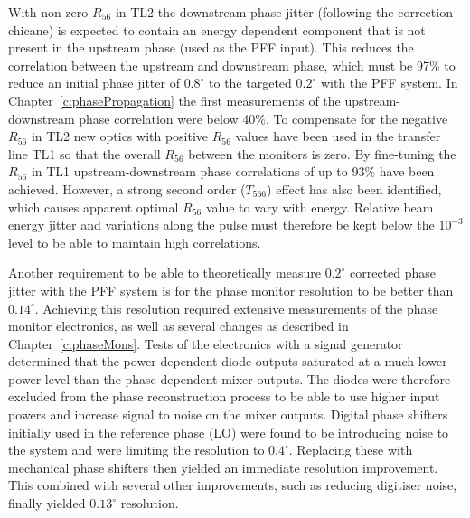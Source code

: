 With non-zero \(R_{56}\) in TL2 the downstream phase jitter (following the correction chicane) is expected to contain an energy dependent component that is not present in the upstream phase (used as the PFF input). This reduces the correlation between the upstream and downstream phase, which must be 97\% to reduce an initial phase jitter of \(0.8^\circ\) to the targeted \(0.2^\circ\) with the PFF system. In Chapter~\ref{c:phasePropagation} the first measurements of the upstream-downstream phase correlation were below 40\%. To compensate for the negative \(R_{56}\) in TL2 new optics with positive \(R_{56}\) values have been used in the transfer line TL1 so that the overall \(R_{56}\) between the monitors is zero. By fine-tuning the \(R_{56}\) in TL1 upstream-downstream phase correlations of up to 93\% have been achieved. However, a strong second order (\(T_{566}\)) effect has also been identified, which causes apparent optimal \(R_{56}\) value to vary with energy. Relative beam energy jitter and variations along the pulse must therefore be kept below the \(10^{-3}\) level to be able to maintain high correlations. 

Another requirement to be able to theoretically measure \(0.2^\circ\) corrected phase jitter with the PFF system is for the phase monitor resolution to be better than \(0.14^\circ\). Achieving this resolution required extensive measurements of the phase monitor electronics, as well as several changes as described in Chapter~\ref{c:phaseMons}. Tests of the electronics with a signal generator determined that the power dependent diode outputs saturated at a much lower power level than the phase dependent mixer outputs. The diodes were therefore excluded from the phase reconstruction process to be able to use higher input powers and increase signal to noise on the mixer outputs. Digital phase shifters initially used in the reference phase (LO) were found to be introducing noise to the system and were limiting the resolution to \(0.4^\circ\). Replacing these with mechanical phase shifters then yielded an immediate resolution improvement. This combined with several other improvements, such as reducing digitiser noise, finally yielded \(0.13^\circ\) resolution.

